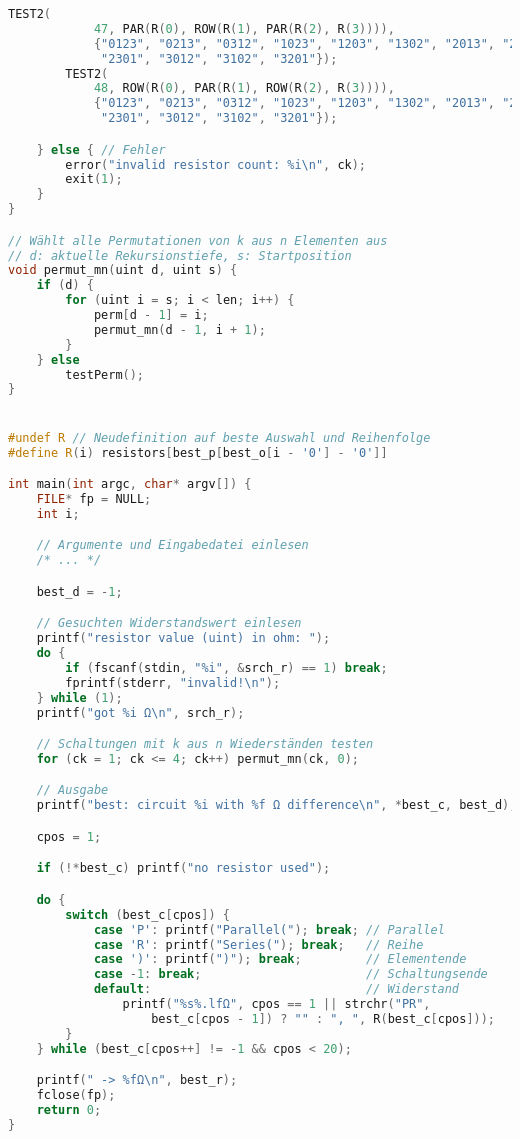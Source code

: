 \documentclass[a4paper,10pt,ngerman]{scrartcl}
\begin{document}
\begin{lstlisting}[language=C++]
        TEST2(
            47, PAR(R(0), ROW(R(1), PAR(R(2), R(3)))),
            {"0123", "0213", "0312", "1023", "1203", "1302", "2013", "2103",
             "2301", "3012", "3102", "3201"});
        TEST2(
            48, ROW(R(0), PAR(R(1), ROW(R(2), R(3)))),
            {"0123", "0213", "0312", "1023", "1203", "1302", "2013", "2103",
             "2301", "3012", "3102", "3201"});

    } else { // Fehler
        error("invalid resistor count: %i\n", ck);
        exit(1);
    }
}

// Wählt alle Permutationen von k aus n Elementen aus
// d: aktuelle Rekursionstiefe, s: Startposition
void permut_mn(uint d, uint s) {
    if (d) {
        for (uint i = s; i < len; i++) {
            perm[d - 1] = i;
            permut_mn(d - 1, i + 1);
        }
    } else
        testPerm();
}


#undef R // Neudefinition auf beste Auswahl und Reihenfolge
#define R(i) resistors[best_p[best_o[i - '0'] - '0']]

int main(int argc, char* argv[]) {
    FILE* fp = NULL;
    int i;

    // Argumente und Eingabedatei einlesen
    /* ... */

    best_d = -1;

    // Gesuchten Widerstandswert einlesen
    printf("resistor value (uint) in ohm: ");
    do {
        if (fscanf(stdin, "%i", &srch_r) == 1) break;
        fprintf(stderr, "invalid!\n");
    } while (1);
    printf("got %i Ω\n", srch_r);

    // Schaltungen mit k aus n Wiederständen testen
    for (ck = 1; ck <= 4; ck++) permut_mn(ck, 0);

    // Ausgabe
    printf("best: circuit %i with %f Ω difference\n", *best_c, best_d);

    cpos = 1;

    if (!*best_c) printf("no resistor used");

    do {
        switch (best_c[cpos]) {
            case 'P': printf("Parallel("); break; // Parallel
            case 'R': printf("Series("); break;   // Reihe
            case ')': printf(")"); break;         // Elementende
            case -1: break;                       // Schaltungsende
            default:                              // Widerstand
                printf("%s%.lfΩ", cpos == 1 || strchr("PR",
                    best_c[cpos - 1]) ? "" : ", ", R(best_c[cpos]));
        }
    } while (best_c[cpos++] != -1 && cpos < 20);

    printf(" -> %fΩ\n", best_r);
    fclose(fp);
    return 0;
}

\end{lstlisting}
\end{document}
